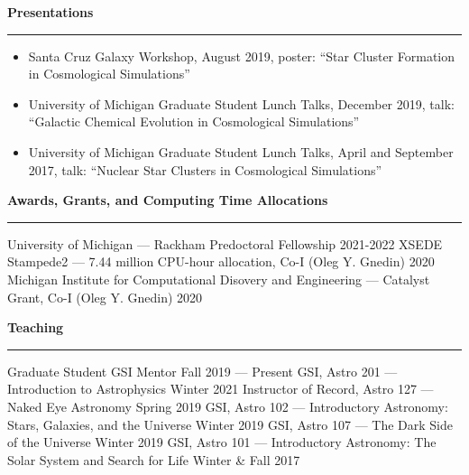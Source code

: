 \documentclass[10pt]{article}
\newcommand{\header}[1]{\vspace{2em}\par \textbf{\large #1}\strut\hrule\vspace{0em}}
\newcommand{\justifiedItemDate}[2]{\newline\null#1 \hfill #2}
\newcommand{\justifiedItemDateFirst}[2]{#1 \hfill #2}
\begin{document}
\header{Presentations}
\begin{itemize}
    \item Santa Cruz Galaxy Workshop, August 2019, poster: ``Star Cluster Formation in Cosmological Simulations''
    \item University of Michigan Graduate Student Lunch Talks, December 2019, talk: ``Galactic Chemical Evolution in Cosmological Simulations''
    \item University of Michigan Graduate Student Lunch Talks, April and September 2017, talk: ``Nuclear Star Clusters in Cosmological Simulations''
\end{itemize}


\header{Awards, Grants, and Computing Time Allocations}
\justifiedItemDateFirst{University of Michigan --- Rackham Predoctoral Fellowship}{2021-2022}
\justifiedItemDate{XSEDE Stampede2 --- 7.44 million CPU-hour allocation, Co-I (Oleg Y. Gnedin)}{2020}
\justifiedItemDate{Michigan Institute for Computational Disovery and Engineering --- Catalyst Grant, Co-I (Oleg Y. Gnedin)}{2020}


\header{Teaching} 
\justifiedItemDateFirst{Graduate Student GSI Mentor}{Fall 2019 --- Present}
\justifiedItemDate{GSI, Astro 201 --- Introduction to Astrophysics}{Winter 2021}
\justifiedItemDate{Instructor of Record, Astro 127 --- Naked Eye Astronomy}{Spring 2019}
\justifiedItemDate{GSI, Astro 102 --- Introductory Astronomy: Stars, Galaxies, and the Universe}{Winter 2019}
\justifiedItemDate{GSI, Astro 107 --- The Dark Side of the Universe}{Winter 2019}
\justifiedItemDate{GSI, Astro 101 --- Introductory Astronomy: The Solar System and Search for Life}{Winter \& Fall 2017}
\end{document}
